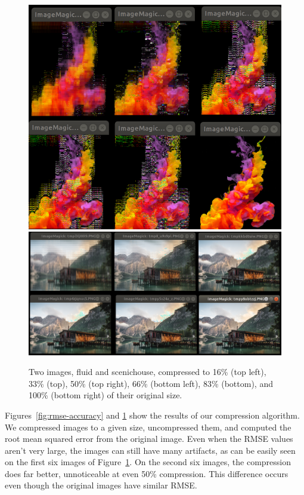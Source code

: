 		\begin{figure}[h]
			\includegraphics[width=\linewidth]{images/imgCompare1.png}
			\includegraphics[width=\linewidth]{images/imgCompare2.png}
			\caption{Two images, fluid and scenichouse, compressed to 16\% (top left), 33\% (top), 50\% (top right), 66\% (bottom left), 83\% (bottom), and 100\% (bottom right) of their original size.}
			\label{fig:perceived-quality}
		\end{figure}
		Figures~\ref{fig:rmse-accuracy} and \ref{fig:perceived-quality} show the results of our compression algorithm. We compressed images to a given size, uncompressed them, and computed the root mean squared error from the original image. Even when the RMSE values aren't very large, the images can still have many artifacts, as can be easily seen on the first six images of Figure~\ref{fig:perceived-quality}. On the second six images, the compression does far better, unnoticeable at even 50\% compression. This
		difference occurs even though the original images have similar RMSE.

